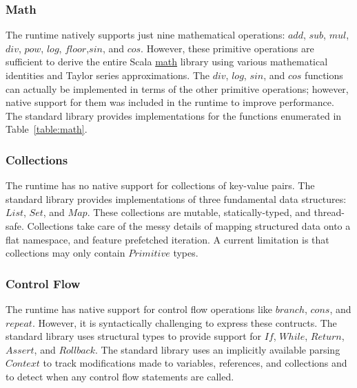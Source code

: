 \documentclass[../main.tex]{subfiles}
\begin{document}
    \subsubsection{Math}
    The runtime natively supports just nine mathematical operations: $add$, $sub$, $mul$, $div$, $pow$,
    $log$, $floor$,$sin$, and $cos$. However, these primitive operations are sufficient to derive the
    entire Scala \href{https://www.scala-lang.org/api/2.12.1/scala/math/index.html}{math} library using
    various mathematical identities and Taylor series approximations. The $div$, $log$, $sin$, and $cos$
    functions can actually be implemented in terms of the other primitive operations; however, native
    support for them was included in the runtime to improve performance. The standard library provides
    implementations for the functions enumerated in Table~\ref{table:math}.

    \subsubsection{Collections}
    The runtime has no native support for collections of key-value pairs. The standard library
    provides implementations of three fundamental data structures: $List$, $Set$, and $Map$. These
    collections are mutable, statically-typed, and thread-safe. Collections take care of the messy
    details of mapping structured data onto a flat namespace, and feature prefetched iteration. A
    current limitation is that collections may only contain $Primitive$ types.

    \subsubsection{Control Flow}
    The runtime has native support for control flow operations like $branch$, $cons$, and $repeat$.
    However, it is syntactically challenging to express these contructs. The standard library
    uses structural types to provide support for $If$, $While$, $Return$, $Assert$, and $Rollback$.
    The standard library uses an implicitly available parsing $Context$ to track modifications made
    to variables, references, and collections and to detect when any control flow statements are
    called.
\end{document}
